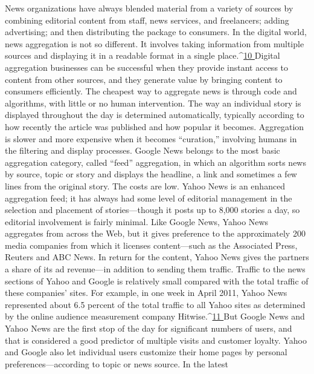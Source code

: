 News organizations have always blended material from a variety of sources
by combining editorial content from staff, news services, and freelancers; adding
advertising; and then distributing the package to consumers. In the digital
world, news aggregation is not so different. It involves taking information from
multiple sources and displaying it in a readable format in a single place.^{\href{#endnotes-ch6}{10 }}Digital
aggregation businesses can be successful when they provide instant access
to content from other sources, and they generate value by bringing content to
consumers efficiently.
The cheapest way to aggregate news is through code and algorithms, with little
or no human intervention. The way an individual story is displayed throughout
the day is determined automatically, typically according to how recently the article
was published and how popular it becomes. Aggregation is slower and more
expensive when it becomes ``curation,'' involving humans in the filtering and
display processes.
Google News belongs to the most basic aggregation category, called ``feed'' aggregation,
in which an algorithm sorts news by source, topic or story and displays
the headline, a link and sometimes a few lines from the original story. The costs
are low.
Yahoo News is an enhanced aggregation feed; it has always had some level of
editorial management in the selection and placement of stories—though it posts
up to 8,000 stories a day, so editorial involvement is fairly minimal. Like Google
News, Yahoo News aggregates from across the Web, but it gives preference to the
approximately 200 media companies from which it licenses content—such as the
Associated Press, Reuters and ABC News. In return for the content, Yahoo News
gives the partners a share of its ad revenue—in addition to sending them traffic.
Traffic to the news sections of Yahoo and Google is relatively small compared
with the total traffic of these companies’ sites. For example, in one week in April
2011, Yahoo News represented about 6.5 percent of the total traffic to all Yahoo
sites as determined by the online audience measurement company Hitwise.^{\href{#endnotes-ch6}{11 }}But
Google News and Yahoo News are the first stop of the day for significant numbers
of users, and that is considered a good predictor of multiple visits and customer
loyalty. Yahoo and Google also let individual users customize their home
pages by personal preferences—according to topic or news source. In the latest

